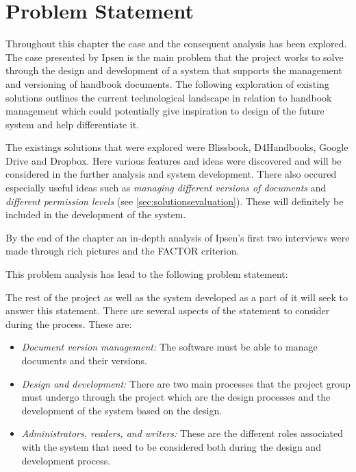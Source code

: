 \section{Problem Statement} \label{problemstatement}
Throughout this chapter the case and the consequent analysis has been explored.
The case presented by Ipsen is the main problem that the project works to solve through the design and development of a system that supports the management and versioning of handbook documents.
The following exploration of existing solutions outlines the current technological landscape in relation to handbook management which could potentially give inspiration to design of the future system and help differentiate it.

The existings solutions that were explored were Blissbook, D4Handbooks, Google Drive and Dropbox.
Here various features and ideas were discovered and will be considered in the further analysis and system development.
There also occured especially useful ideas such as \textit{managing different versions of documents} and \textit{different permission levels} (see \cref{sec:solutionsevaluation}).
These will definitely be included in the development of the system.

By the end of the chapter an in-depth analysis of Ipsen's first two interviews were made through rich pictures and the FACTOR criterion.

This problem analysis has lead to the following problem statement:



The rest of the project as well as  the system developed as a part of it will seek to answer this statement.
There are several aspects of the statement to consider during the process.
These are:
\begin{itemize}
	\item
		\textit{Document version management:}
		The software must be able to manage documents and their versions.
	\item
		\textit{Design and development:}
		There are two main processes that the project group must undergo through the project which are the design processes and the development of the system based on the design.
	\item
		\textit{Administrators, readers, and writers:}
		These are the different roles associated with the system that need to be considered both during the design and development process.
\end{itemize}
